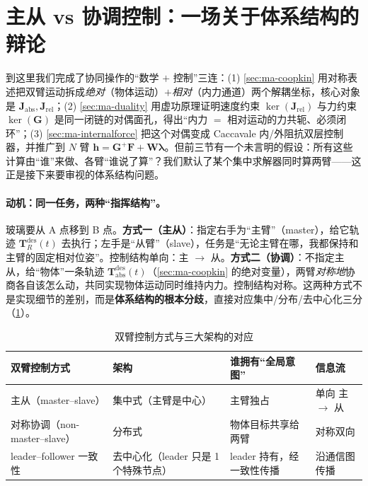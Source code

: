 \section{主从 vs 协调控制：一场关于体系结构的辩论}
\label{sec:ma-arch}

\begin{insight}
到这里我们完成了协同操作的“数学 $+$ 控制”三连：(1) \cref{sec:ma-coopkin} 用对称表述把双臂运动拆成\emph{绝对}（物体运动）$+$\emph{相对}（内力通道）两个解耦坐标，核心对象是 $\mathbf{J}_{\text{abs}},\mathbf{J}_{\text{rel}}$；(2) \cref{sec:ma-duality} 用虚功原理证明速度约束 $\ker(\mathbf{J}_{\text{rel}})$ 与力约束 $\ker(\mathbf{G})$ 是同一闭链的对偶面孔，得出“内力 $=$ 相对运动的力共轭、必须闭环”；(3) \cref{sec:ma-internalforce} 把这个对偶变成 Caccavale 内/外阻抗双层控制器，并推广到 $N$ 臂 $\mathbf{h}=\mathbf{G}^{+}\mathbf{F}+\mathbf{W}\boldsymbol{\lambda}$。但前三节有一个未言明的假设：所有这些计算由“谁”来做、各臂“谁说了算”？我们默认了某个集中求解器同时算两臂——这正是接下来要审视的体系结构问题。
\end{insight}

\paragraph{动机：同一任务，两种“指挥结构”。}
玻璃要从 A 点移到 B 点。\textbf{方式一（主从）}：指定右手为“主臂”（master），给它轨迹 $\mathbf{T}_R^{\text{des}}(t)$ 去执行；左手是“从臂”（slave），任务是“无论主臂在哪，我都保持和主臂的固定相对位姿”。控制结构单向：主 $\to$ 从。\textbf{方式二（协调）}：不指定主从，给“物体”一条轨迹 $\mathbf{T}_{\text{abs}}^{\text{des}}(t)$（\cref{sec:ma-coopkin} 的绝对变量），两臂\emph{对称地}协商各自该怎么动，共同实现物体运动同时维持内力。控制结构对称。这两种方式不是实现细节的差别，而是\textbf{体系结构的根本分歧}，直接对应集中/分布/去中心化三分（\cref{tab:ma-arch-map}）。

\begin{table}[H]\centering\small
\caption{双臂控制方式与三大架构的对应}
\label{tab:ma-arch-map}
\begin{tabular}{llll}
\toprule
双臂控制方式 & 架构 & 谁拥有“全局意图” & 信息流 \\
\midrule
主从（master--slave） & 集中式（主臂是中心） & 主臂独占 & 单向 主 $\to$ 从 \\
对称协调（non-master--slave） & 分布式 & 物体目标共享给两臂 & 对称双向 \\
leader--follower 一致性 & 去中心化（leader 只是 1 个特殊节点） & leader 持有，经一致性传播 & 沿通信图传播 \\
\bottomrule
\end{tabular}
\end{table}

